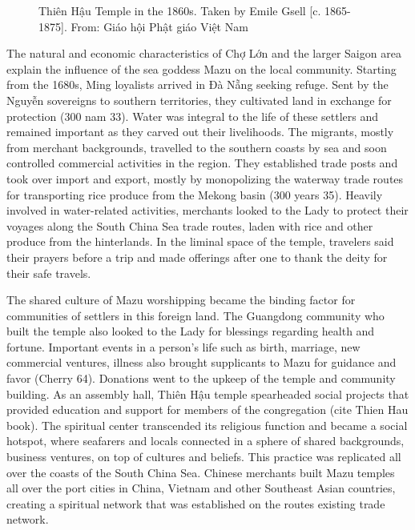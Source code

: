 \begin{figure}[!ht]
\begin{center}
\vspace{-.2 in}
\caption[\vi Thiên Hậu Temple in the 1860s \en]{\vi Thiên Hậu Temple in the 1860s. Taken by Emile Gsell [c. 1865-1875]. From: Giáo hội Phật giáo Việt Nam \en}\label{thienhau_past}
\end{center}
\vspace{-.2 in}
\end{figure}
\vi
The natural and economic characteristics of Chợ Lớn and the larger Saigon area explain the influence of the sea goddess Mazu on the local community. Starting from the 1680s, Ming loyalists arrived in Đà Nẵng seeking refuge. Sent by the Nguyễn sovereigns to southern territories, they cultivated  land in exchange for protection (300 nam 33). Water was integral to the life of these settlers and remained important as they carved out their livelihoods. The migrants, mostly from merchant backgrounds, travelled to the southern coasts by sea and soon controlled commercial activities in the region. They established trade posts and took over import and export, mostly by monopolizing the waterway trade routes for transporting rice produce from the Mekong basin (300 years 35). Heavily involved in water-related activities, merchants looked to the Lady to protect their voyages along the South China Sea trade routes, laden with rice and other produce from the hinterlands. In the liminal space of the temple, travelers said their prayers before a trip and made offerings after one to thank the deity for their safe travels.

The shared culture of Mazu worshipping became the binding factor for communities of settlers in this foreign land. The Guangdong community who built the temple also looked to the Lady for blessings regarding health and fortune. Important events in a person’s life such as birth, marriage, new commercial ventures, illness also brought supplicants to Mazu for guidance and favor (Cherry 64). Donations went to the upkeep of the temple and community building. As an assembly hall, Thiên Hậu temple spearheaded social projects that provided education and support for members of the congregation (cite Thien Hau book). The spiritual center transcended its religious function and became a social hotspot, where seafarers and locals connected in a sphere of shared backgrounds, business ventures, on top of cultures and beliefs. This practice was replicated all over the coasts of the South China Sea. Chinese merchants built Mazu temples all over the port cities in China, Vietnam and other Southeast Asian countries, creating a spiritual network that was established on the routes existing trade network.

